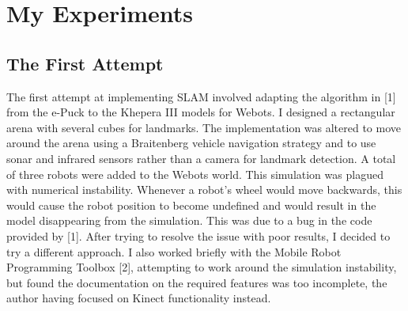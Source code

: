 \documentclass[12pt]{article}
\begin{document}
\section{My Experiments}
\subsection{The First Attempt}
The first attempt at implementing SLAM involved adapting the algorithm in [1] from the e-Puck to the Khepera III models for Webots.  I designed a rectangular arena with several cubes for landmarks.  The implementation was altered to move around the arena using a Braitenberg vehicle navigation strategy and to use sonar and infrared sensors rather than a camera for landmark detection.  A total of three robots were added to the Webots world.  This simulation was plagued with numerical instability.  
Whenever a robot’s wheel would move backwards, this would cause the robot position to become undefined and would result in the model disappearing from the simulation.  This was due to a bug in the code provided by [1].  After trying to resolve the issue with poor results, I decided to try a different approach.  I also worked briefly with the Mobile Robot Programming Toolbox [2], attempting to work around the simulation instability, but found the documentation on the required features was too incomplete, the author having focused on Kinect functionality instead.
\end{document}
